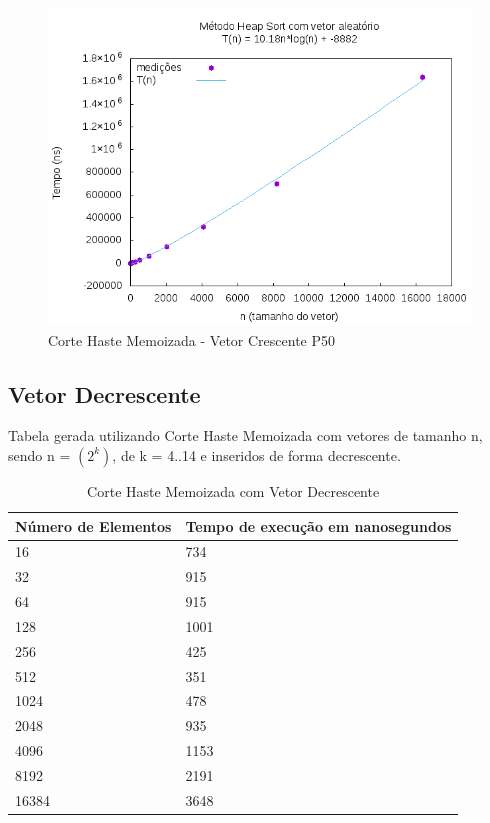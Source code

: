 \documentclass[12pt,a4paper,twoside]{report}
\begin{document}
\begin{figure}[H]
    \centering
    \includegraphics[width=0.7\linewidth]{graficos/HeapSort/vIntAleatorio/vIntAleatorio.png}
  \caption{Corte Haste Memoizada - Vetor Crescente P50}
\end{figure}


\subsection{Vetor Decrescente}
Tabela gerada utilizando Corte Haste Memoizada com vetores de tamanho n, sendo n = $(2^k)$, de k = 4..14 e inseridos de forma decrescente.
\begin{table}[H]
\centering
\caption{Corte Haste Memoizada com Vetor Decrescente}
\label{my-label}
\begin{tabular}{|l|l|}
\hline
\multicolumn{1}{|c|}{\textbf{Número de Elementos}} & \multicolumn{1}{c|}{\textbf{Tempo de execução em nanosegundos}} \\ \hline
16 & 734 \\ \hline
32 & 915 \\ \hline
64 & 915 \\ \hline
128 & 1001 \\ \hline
256 & 425 \\ \hline
512 & 351 \\ \hline
1024 & 478 \\ \hline
2048 & 935 \\ \hline
4096 & 1153 \\ \hline
8192 & 2191 \\ \hline
16384 & 3648 \\ \hline
\end{tabular}
\end{table}
\end{document}
